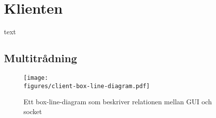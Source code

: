 \documentclass[tekniskrapport/tech.tex]{subfiles}
\begin{document}
\section{Klienten}
text
\subsection{Multitrådning}
	\begin{figure}[h]
    		\centering
		\texttt{[image: \\figures/client-box-line-diagram.pdf]}
    		\caption{Ett box-line-diagram som beskriver relationen mellan GUI och socket}
    		\label{fig:client}
	\end{figure}
\end{document}

